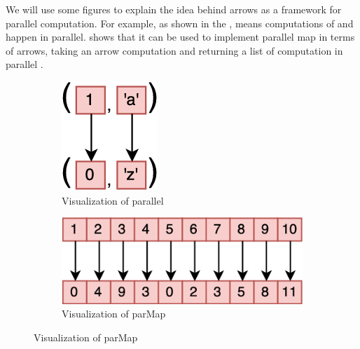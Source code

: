 We will use some figures to explain the idea behind arrows as a framework for parallel computation. For example, as shown in the ,  means computations of  and  happen in parallel.  shows that it can be used to implement parallel map in terms of arrows, taking an arrow computation  and returning a list of computation in parallel . 
\begin{figure}[ht]
\begin{subfigure}[b]{0.475\textwidth}
  \centering
  \includegraphics[width=\textwidth/3]{background/image/pareval2.png}
  \caption{Visualization of parallel \hask{***} \cite{braunArrowsParallelComputation2018}}
  \label{b:ar:p3}
\end{subfigure}
\hfill
\begin{subfigure}[b]{0.475\textwidth}
  \centering
  \includegraphics[width=\textwidth]{background/image/parevaln.png}
  \caption{Visualization of parMap \cite{braunArrowsParallelComputation2018}}
  \label{b:ar:p4}
\end{subfigure}
\end{figure}
